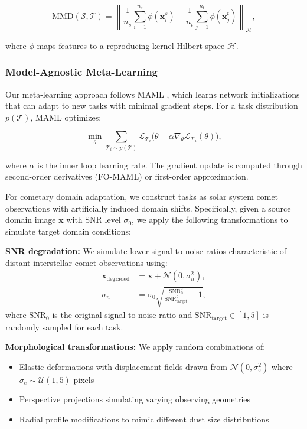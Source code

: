 \documentclass[preprint2]{aastex631}
\begin{document}
\begin{equation}\label{eq:mmd}
\text{MMD}(\mathcal{S}, \mathcal{T}) = \left\| \frac{1}{n_s} \sum_{i=1}^{n_s} \phi(\mathbf{x}_i^s) - \frac{1}{n_t} \sum_{j=1}^{n_t} \phi(\mathbf{x}_j^t) \right\|_{\mathcal{H}},
\end{equation}

where $\phi$ maps features to a reproducing kernel Hilbert space $\mathcal{H}$.

\subsubsection{Model-Agnostic Meta-Learning}

Our meta-learning approach follows MAML \citep{finn17}, which learns network initializations that can adapt to new tasks with minimal gradient steps. For a task distribution $p(\mathcal{T})$, MAML optimizes:

\begin{equation}\label{eq:maml}
\min_\theta \sum_{\mathcal{T}_i \sim p(\mathcal{T})}
\mathcal{L}_{\mathcal{T}_i}\bigl(\theta - \alpha \nabla_\theta \mathcal{L}_{\mathcal{T}_i}(\theta)\bigr),
\end{equation}

where $\alpha$ is the inner loop learning rate. The gradient update is computed through second-order derivatives (FO-MAML) or first-order approximation.

For cometary domain adaptation, we construct tasks as solar system comet observations with artificially induced domain shifts. Specifically, given a source domain image $\mathbf{x}$ with SNR level $\sigma_0$, we apply the following transformations to simulate target domain conditions:

\textbf{SNR degradation:} We simulate lower signal-to-noise ratios characteristic of distant interstellar comet observations using:
\begin{equation}\label{eq:snr_degradation}
\begin{split}
\mathbf{x}_{\text{degraded}} &= \mathbf{x} + \mathcal{N}(0, \sigma_n^2), \\
\sigma_n &= \sigma_0 \sqrt{\frac{\text{SNR}_0^2}{\text{SNR}_{\text{target}}^2} - 1},
\end{split}
\end{equation}
where $\text{SNR}_0$ is the original signal-to-noise ratio and $\text{SNR}_{\text{target}} \in [1, 5]$ is randomly sampled for each task.

\textbf{Morphological transformations:} We apply random combinations of:
\begin{itemize}
    \item Elastic deformations with displacement fields drawn from $\mathcal{N}(0, \sigma_e^2)$ where $\sigma_e \sim \mathcal{U}(1, 5)$ pixels
    \item Perspective projections simulating varying observing geometries
    \item Radial profile modifications to mimic different dust size distributions
\end{itemize}
\end{document}
